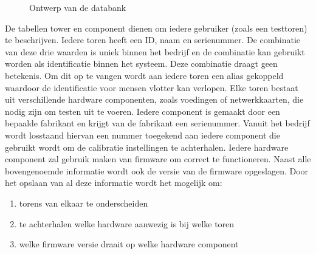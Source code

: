 \begin{figure}[!ht]
\centering
{}
\caption{Ontwerp van de databank}
\label{fig:databank}
\end{figure}

De tabellen tower en component dienen om iedere gebruiker (zoals een testtoren) te beschrijven.
Iedere toren heeft een ID, naam en serienummer.
De combinatie van deze drie waarden is uniek binnen het bedrijf en de combinatie kan gebruikt worden als identificatie binnen het systeem.
Deze combinatie draagt geen betekenis.
Om dit op te vangen wordt aan iedere toren een alias gekoppeld waardoor de identificatie voor mensen vlotter kan verlopen.
Elke toren bestaat uit verschillende hardware componenten, zoals voedingen of netwerkkaarten, die nodig zijn om testen uit te voeren.
Iedere component is gemaakt door een bepaalde fabrikant en krijgt van de fabrikant een serienummer.
Vanuit het bedrijf wordt losstaand hiervan een nummer toegekend aan iedere component die gebruikt wordt om de calibratie instellingen te achterhalen.
Iedere hardware component zal gebruik maken van firmware om correct te functioneren.
Naast alle bovengenoemde informatie wordt ook de versie van de firmware opgeslagen.
Door het opslaan van al deze informatie wordt het mogelijk om:
\begin{enumerate}
\item torens van elkaar te onderscheiden
\item te achterhalen welke hardware aanwezig is bij welke toren
\item welke firmware versie draait op welke hardware component
\end{enumerate}

